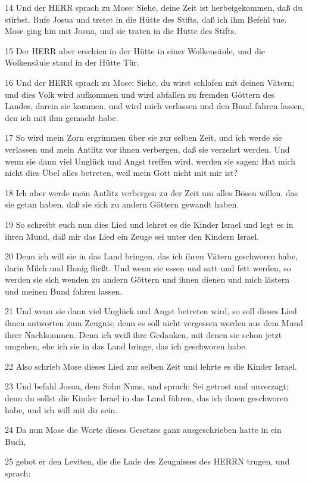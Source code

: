 \par 14 Und der HERR sprach zu Mose: Siehe, deine Zeit ist herbeigekommen, daß du stirbst. Rufe Josua und tretet in die Hütte des Stifts, daß ich ihm Befehl tue. Mose ging hin mit Josua, und sie traten in die Hütte des Stifts.
\par 15 Der HERR aber erschien in der Hütte in einer Wolkensäule, und die Wolkensäule stand in der Hütte Tür.
\par 16 Und der HERR sprach zu Mose: Siehe, du wirst schlafen mit deinen Vätern; und dies Volk wird aufkommen und wird abfallen zu fremden Göttern des Landes, darein sie kommen, und wird mich verlassen und den Bund fahren lassen, den ich mit ihm gemacht habe.
\par 17 So wird mein Zorn ergrimmen über sie zur selben Zeit, und ich werde sie verlassen und mein Antlitz vor ihnen verbergen, daß sie verzehrt werden. Und wenn sie dann viel Unglück und Angst treffen wird, werden sie sagen: Hat mich nicht dies Übel alles betreten, weil mein Gott nicht mit mir ist?
\par 18 Ich aber werde mein Antlitz verbergen zu der Zeit um alles Bösen willen, das sie getan haben, daß sie sich zu andern Göttern gewandt haben.
\par 19 So schreibt euch nun dies Lied und lehret es die Kinder Israel und legt es in ihren Mund, daß mir das Lied ein Zeuge sei unter den Kindern Israel.
\par 20 Denn ich will sie in das Land bringen, das ich ihren Vätern geschworen habe, darin Milch und Honig fließt. Und wenn sie essen und satt und fett werden, so werden sie sich wenden zu andern Göttern und ihnen dienen und mich lästern und meinen Bund fahren lassen.
\par 21 Und wenn sie dann viel Unglück und Angst betreten wird, so soll dieses Lied ihnen antworten zum Zeugnis; denn es soll nicht vergessen werden aus dem Mund ihrer Nachkommen. Denn ich weiß ihre Gedanken, mit denen sie schon jetzt umgehen, ehe ich sie in das Land bringe, das ich geschworen habe.
\par 22 Also schrieb Mose dieses Lied zur selben Zeit und lehrte es die Kinder Israel.
\par 23 Und befahl Josua, dem Sohn Nuns, und sprach: Sei getrost und unverzagt; denn du sollst die Kinder Israel in das Land führen, das ich ihnen geschworen habe, und ich will mit dir sein.
\par 24 Da nun Mose die Worte dieses Gesetzes ganz ausgeschrieben hatte in ein Buch,
\par 25 gebot er den Leviten, die die Lade des Zeugnisses des HERRN trugen, und sprach:
